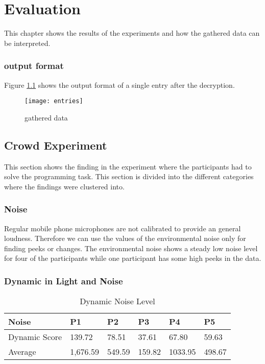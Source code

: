 \chapter{Evaluation}
This chapter shows the results of the experiments and how the gathered data can be interpreted. 

\subsection{output format}
Figure \ref{entries} shows the output format of a single entry after the decryption. 

\begin{figure}[!htb]
\centering
\texttt{[image: entries]}
\caption{gathered data}\label{entries}
\vspace{10 mm}
\end{figure}

\FloatBarrier

\section{Crowd Experiment}
This section shows the finding in the experiment where the participants had to solve the programming task. This section is divided into the different categories where the findings were clustered into. 

\subsection{Noise}
Regular mobile phone microphones are not calibrated to provide an general loudness. Therefore we can use the values of the environmental noise only for finding peeks or changes.
The environmental noise shows a steady low noise level for four of the participants while one participant has some high peeks in the data. 

\subsection{Dynamic in Light and Noise}
\FloatBarrier

\begin{table}[ht]
  \begin{tabular}{|P{3cm}|P{1.6cm}|P{1.6cm}|P{1.6cm}|P{1.6cm}|P{1.6cm}|}
   	\textbf{Noise}				& \textbf{P1}			& \textbf{P2}			& 	\textbf{P3}		& 	\textbf{P4}			& 	\textbf{P5}	\\ \hline
  	Dynamic Score				& 139.72					& 78.51					& 37.61				& 67.80					& 59.63			\\ \hline
  	Average 						& 1,676.59				& 549.59					& 159.82				& 1033.95				& 498.67			\\ \hline
  	\end{tabular}
  	\newline\newline
  	\caption{Dynamic Noise Level}\label{dynNoise}
\end{table}

